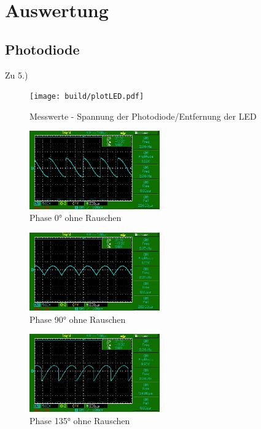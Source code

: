 \newpage
\section{Auswertung}
\label{sec:Auswertung}
\subsection{Photodiode}
Zu 5.)\\

\begin{figure}
    \centering
    \texttt{[image: build/plotLED.pdf]}
    \caption{Messwerte - Spannung der Photodiode/Entfernung der LED}        
    \label{fig:plotLED}
\end{figure}

\begin{figure}
    \centering
    \includegraphics[width=0.5\textwidth]{bilder/MAP001.png}
    \caption{Phase 0° ohne Rauschen}        
    \label{fig:MAP001}
\end{figure}

\begin{figure}
    \centering
    \includegraphics[width=0.5\textwidth]{bilder/MAP002.png}
    \caption{Phase 90° ohne Rauschen}        
    \label{fig:MAP002}
\end{figure}

\begin{figure}
    \centering
    \includegraphics[width=0.5\textwidth]{bilder/MAP005.png}
    \caption{Phase 135° ohne Rauschen}        
    \label{fig:MAP005}
\end{figure}

